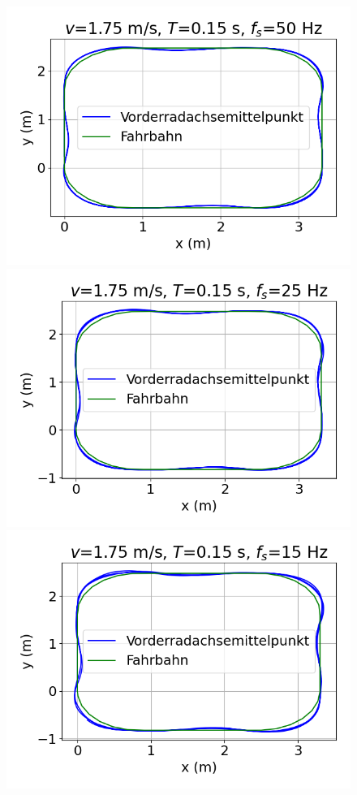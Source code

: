 \documentclass[arbeit=studie,oneside,BCOR=12mm]{ArbeitRST}
\begin{document}
\begin{figure}[h]
    \centering
    \includegraphics[scale=0.47]{50Hz}
    \includegraphics[scale=0.47]{25Hz}
    \includegraphics[scale=0.47]{15Hz}

\end{figure}
\end{document}
